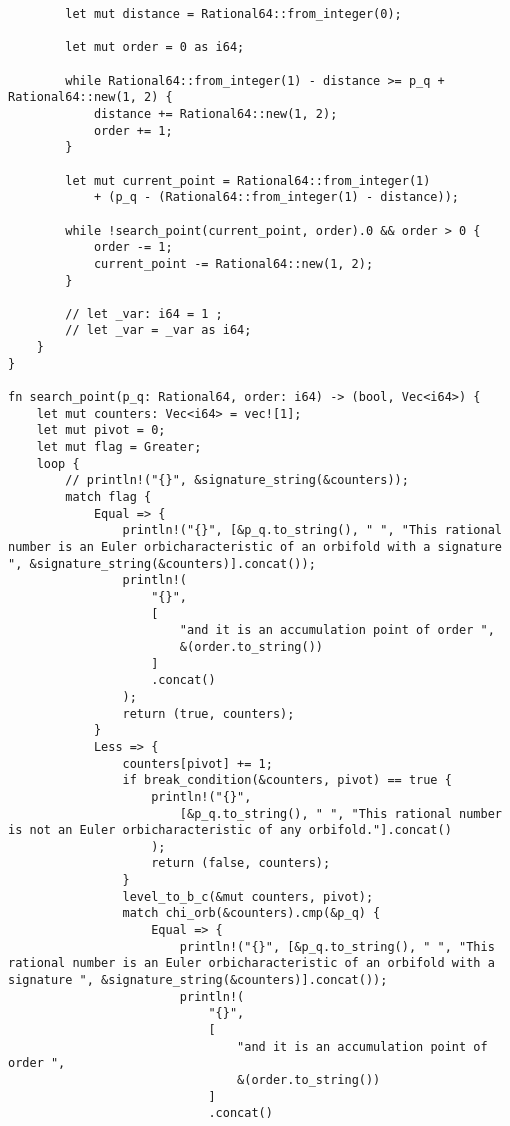 \begin{lstlisting}
        let mut distance = Rational64::from_integer(0);

        let mut order = 0 as i64;

        while Rational64::from_integer(1) - distance >= p_q + Rational64::new(1, 2) {
            distance += Rational64::new(1, 2);
            order += 1;
        }

        let mut current_point = Rational64::from_integer(1)
            + (p_q - (Rational64::from_integer(1) - distance));

        while !search_point(current_point, order).0 && order > 0 {
            order -= 1;
            current_point -= Rational64::new(1, 2);
        }

        // let _var: i64 = 1 ;
        // let _var = _var as i64;
    }
}

fn search_point(p_q: Rational64, order: i64) -> (bool, Vec<i64>) {
    let mut counters: Vec<i64> = vec![1];
    let mut pivot = 0;
    let mut flag = Greater;
    loop {
        // println!("{}", &signature_string(&counters));
        match flag {
            Equal => {
                println!("{}", [&p_q.to_string(), " ", "This rational number is an Euler orbicharacteristic of an orbifold with a signature ", &signature_string(&counters)].concat());
                println!(
                    "{}",
                    [
                        "and it is an accumulation point of order ",
                        &(order.to_string())
                    ]
                    .concat()
                );
                return (true, counters);
            }
            Less => {
                counters[pivot] += 1;
                if break_condition(&counters, pivot) == true {
                    println!("{}",
                        [&p_q.to_string(), " ", "This rational number is not an Euler orbicharacteristic of any orbifold."].concat()
                    );
                    return (false, counters);
                }
                level_to_b_c(&mut counters, pivot);
                match chi_orb(&counters).cmp(&p_q) {
                    Equal => {
                        println!("{}", [&p_q.to_string(), " ", "This rational number is an Euler orbicharacteristic of an orbifold with a signature ", &signature_string(&counters)].concat());
                        println!(
                            "{}",
                            [
                                "and it is an accumulation point of order ",
                                &(order.to_string())
                            ]
                            .concat()

\end{lstlisting}
